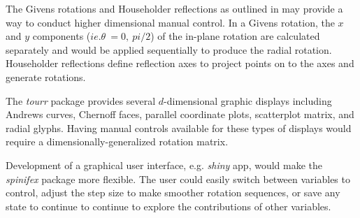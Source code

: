 \documentclass{monashthesis}
\begin{document}
The Givens rotations and Householder reflections as outlined in
\textcite{buja_computational_2005} may provide a way to conduct higher
dimensional manual control. In a Givens rotation, the \(x\) and \(y\)
components (\(ie. \theta~= 0,~pi/2\)) of the in-plane rotation are
calculated separately and would be applied sequentially to produce the
radial rotation. Householder reflections define reflection axes to
project points on to the axes and generate rotations.

The \emph{tourr} package provides several \(d\)-dimensional graphic
displays including Andrews curves, Chernoff faces, parallel coordinate
plots, scatterplot matrix, and radial glyphs. Having manual controls
available for these types of displays would require a
dimensionally-generalized rotation matrix.

Development of a graphical user interface, e.g. \emph{shiny} app, would
make the \emph{spinifex} package more flexible. The user could easily
switch between variables to control, adjust the step size to make
smoother rotation sequences, or save any state to continue to continue
to explore the contributions of other variables.

\printbibliography[heading=bibintoc]
\end{document}
